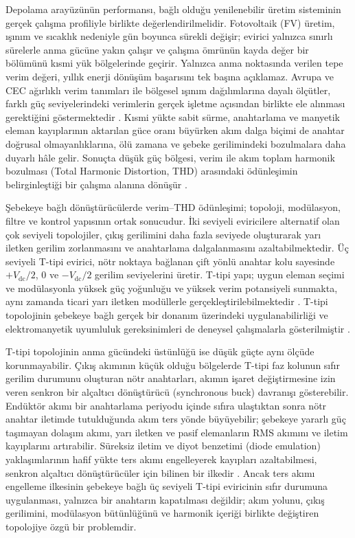 Depolama arayüzünün performansı, bağlı olduğu yenilenebilir üretim sisteminin gerçek çalışma profiliyle birlikte değerlendirilmelidir. Fotovoltaik (FV) üretim, ışınım ve sıcaklık nedeniyle gün boyunca sürekli değişir; evirici yalnızca sınırlı sürelerle anma gücüne yakın çalışır ve çalışma ömrünün kayda değer bir bölümünü kısmi yük bölgelerinde geçirir. Yalnızca anma noktasında verilen tepe verim değeri, yıllık enerji dönüşüm başarısını tek başına açıklamaz. Avrupa ve CEC ağırlıklı verim tanımları ile bölgesel ışınım dağılımlarına dayalı ölçütler, farklı güç seviyelerindeki verimlerin gerçek işletme açısından birlikte ele alınması gerektiğini göstermektedir \citep{Meinhardt2000,Sera2008,Sandia2015,Ongun2013}. Kısmi yükte sabit sürme, anahtarlama ve manyetik eleman kayıplarının aktarılan güce oranı büyürken akım dalga biçimi de anahtar doğrusal olmayanlıklarına, ölü zamana ve şebeke gerilimindeki bozulmalara daha duyarlı hâle gelir. Sonuçta düşük güç bölgesi, verim ile akım toplam harmonik bozulması (Total Harmonic Distortion, THD) arasındaki ödünleşimin belirginleştiği bir çalışma alanına dönüşür \citep{Kjaer2005,Chicco2009}.

Şebekeye bağlı dönüştürücülerde verim--THD ödünleşimi; topoloji, modülasyon, filtre ve kontrol yapısının ortak sonucudur. İki seviyeli eviricilere alternatif olan çok seviyeli topolojiler, çıkış gerilimini daha fazla seviyede oluşturarak yarı iletken gerilim zorlanmasını ve anahtarlama dalgalanmasını azaltabilmektedir. Üç seviyeli T-tipi evirici, nötr noktaya bağlanan çift yönlü anahtar kolu sayesinde $+V_{\mathrm{dc}}/2$, $0$ ve $-V_{\mathrm{dc}}/2$ gerilim seviyelerini üretir. T-tipi yapı; uygun eleman seçimi ve modülasyonla yüksek güç yoğunluğu ve yüksek verim potansiyeli sunmakta, aynı zamanda ticari yarı iletken modüllerle gerçekleştirilebilmektedir \citep{Wang2020}. T-tipi topolojinin şebekeye bağlı gerçek bir donanım üzerindeki uygulanabilirliği ve elektromanyetik uyumluluk gereksinimleri de deneysel çalışmalarla gösterilmiştir \citep{Hizarci2021}.

T-tipi topolojinin anma gücündeki üstünlüğü ise düşük güçte aynı ölçüde korunmayabilir. Çıkış akımının küçük olduğu bölgelerde T-tipi faz kolunun sıfır gerilim durumunu oluşturan nötr anahtarları, akımın işaret değiştirmesine izin veren senkron bir alçaltıcı dönüştürücü (synchronous buck) davranışı gösterebilir. Endüktör akımı bir anahtarlama periyodu içinde sıfıra ulaştıktan sonra nötr anahtar iletimde tutulduğunda akım ters yönde büyüyebilir; şebekeye yararlı güç taşımayan dolaşım akımı, yarı iletken ve pasif elemanların RMS akımını ve iletim kayıplarını artırabilir. Süreksiz iletim ve diyot benzetimi (diode emulation) yaklaşımlarının hafif yükte ters akımı engelleyerek kayıpları azaltabilmesi, senkron alçaltıcı dönüştürücüler için bilinen bir ilkedir \citep{Erickson2001,Mohan2003,Chen2010}. Ancak ters akımı engelleme ilkesinin şebekeye bağlı üç seviyeli T-tipi eviricinin sıfır durumuna uygulanması, yalnızca bir anahtarın kapatılması değildir; akım yolunu, çıkış gerilimini, modülasyon bütünlüğünü ve harmonik içeriği birlikte değiştiren topolojiye özgü bir problemdir.

